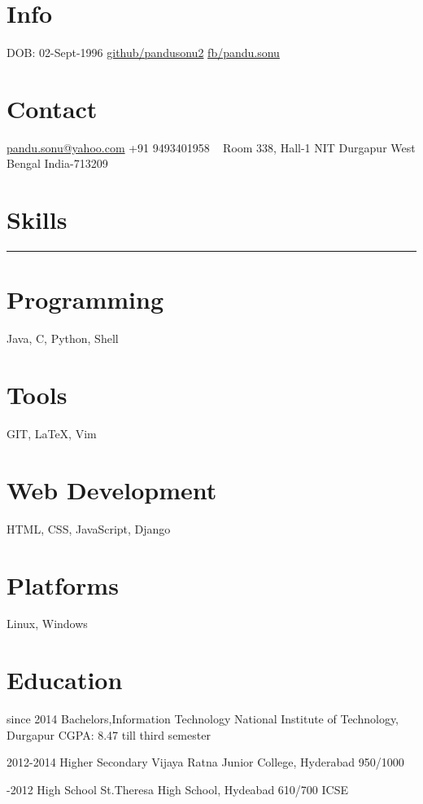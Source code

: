 \documentclass[]{friggeri-cv-a4}
\begin{document}


\begin{aside}
\section{Info}
DOB: 02-Sept-1996
\href{http://github.com/pandusonu2}{github/pandusonu2}
\href{http://www.fb.com/pandu.sonu}{fb/pandu.sonu}

\section{Contact}
\href{mailto:pandu.sonu@yahoo.com}{pandu.sonu@yahoo.com}
+91 9493401958
~
Room 338, Hall-1
NIT Durgapur
West Bengal
India-713209
~
\section{Skills}
\noindent\rule{3cm}{0.5pt}
\section{Programming}
Java, C, Python, Shell
\section{Tools}
GIT, \LaTeX, Vim
\section{Web Development}
HTML, CSS, JavaScript, Django
\section{Platforms}
Linux, Windows
\end{aside}


\section{\normalfont Education}

\begin{entrylist}

\entry
{since 2014}
{Bachelors,{\normalfont Information Technology}}
{National Institute of Technology, Durgapur}
{CGPA: 8.47 till third semester}
{}

\entry
{2012-2014}
{Higher Secondary}
{Vijaya Ratna Junior College, Hyderabad}
{950/1000}
{}

\entry
{-2012}
{High School}
{St.Theresa High School, Hydeabad}
{610/700 ICSE}
{}

\end{entrylist}
\end{document}
